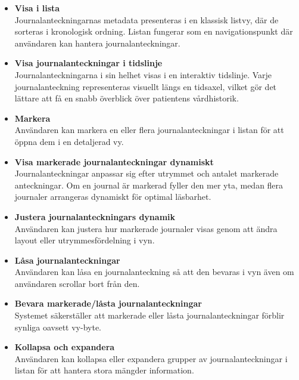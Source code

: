 \documentclass{article}
\begin{document}
\begin{itemize}
    \item \textbf{Visa i lista} \\
    Journalanteckningarnas metadata presenteras i en klassisk listvy, där de sorteras i kronologisk ordning. Listan fungerar som en navigationspunkt där användaren kan hantera journalanteckningar.

    \item \textbf{Visa journalanteckningar i tidslinje} \\
    Journalanteckningarna i sin helhet visas i en interaktiv tidslinje. Varje journalanteckning representeras visuellt längs en tidsaxel, vilket gör det lättare att få en snabb överblick över patientens vårdhistorik.

    \item \textbf{Markera} \\
    Användaren kan markera en eller flera journalanteckningar i listan för att öppna dem i en detaljerad vy.

    \item \textbf{Visa markerade journalanteckningar dynamiskt} \\
    Journalanteckningar anpassar sig efter utrymmet och antalet markerade anteckningar. Om en journal är markerad fyller den mer yta, medan flera journaler arrangeras dynamiskt för optimal läsbarhet.

    \item \textbf{Justera journalanteckningars dynamik} \\
    Användaren kan justera hur markerade journaler visas genom att ändra layout eller utrymmesfördelning i vyn.

    \item \textbf{Låsa journalanteckningar} \\
    Användaren kan låsa en journalanteckning så att den bevaras i vyn även om användaren scrollar bort från den.

    \item \textbf{Bevara markerade/låsta journalanteckningar} \\
    Systemet säkerställer att markerade eller låsta journalanteckningar förblir synliga oavsett vy-byte.

    \item \textbf{Kollapsa och expandera} \\
    Användaren kan kollapsa eller expandera grupper av journalanteckningar i listan för att hantera stora mängder information.


\end{itemize}
\end{document}
